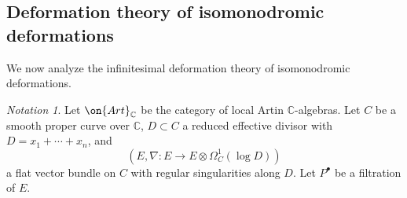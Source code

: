 \documentclass[12 pt]{amsart}
\theoremstyle{plain}
\theoremstyle{definition}
\theoremstyle{remark}
\newtheorem{notation}[subsubsection]{Notation}
\numberwithin{equation}{section}
\begin{document}
\subsection{Deformation theory of isomonodromic deformations}\label{subsection:filtered-bundle-deformations}
We now analyze the infinitesimal deformation theory of isomonodromic
deformations. 
\begin{notation}\label{notation:deformation-theory-iso}
    Let $\on{Art}_{\mathbb{C}}$ be the category of local Artin
$\mathbb{C}$-algebras. Let $C$ be a smooth proper curve over $\mathbb{C}$,
$D\subset C$ a reduced effective divisor with $D=x_1+\cdots+x_n$, and $$({E}, \nabla: {E}\to
{E}\otimes\Omega^1_C(\log D))$$ a flat vector bundle on $C$ with regular 
singularities along $D$. Let $P^\bullet$ be a filtration of $E$.
\end{notation}
\end{document}
